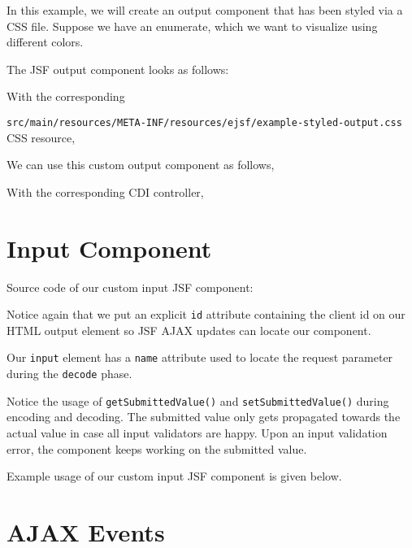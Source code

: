 In this example, we will create an output component that has been styled via a CSS file.
Suppose we have an enumerate, which we want to visualize using different colors.


The JSF output component looks as follows:


With the corresponding

\texttt{src/main/resources/META-INF/resources/ejsf/example-styled-output.css} CSS resource,


We can use this custom output component as follows,


With the corresponding CDI controller,



\section{Input Component}

Source code of our custom input JSF component:


Notice again that we put an explicit \texttt{id} attribute containing the client id on our HTML output element so JSF AJAX updates can locate our component.

Our \texttt{input} element has a \texttt{name} attribute used to locate the request parameter during the \texttt{decode} phase.

Notice the usage of \texttt{getSubmittedValue()} and \texttt{setSubmittedValue()} during encoding and decoding.
The submitted value only gets propagated towards the actual value in case all input validators are happy.
Upon an input validation error, the component keeps working on the submitted value.

Example usage of our custom input JSF component is given below.


\section{AJAX Events}

